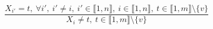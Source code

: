 $$\frac{X_{i'}=t,~\forall i',~i' \neq i,~i' \in \llbracket1,n\rrbracket,~i \in \llbracket1,n\rrbracket,~t \in \llbracket1,m\rrbracket \setminus \{v\}}{X_{i} \neq t,~t \in \llbracket1,m\rrbracket \setminus \{v\}}$$ 

